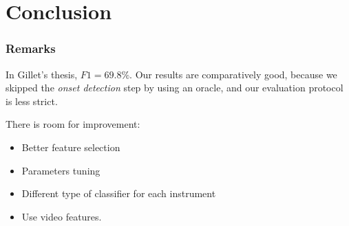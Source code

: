 \documentclass{beamer}
\begin{document}
    \section{Conclusion}

    \begin{frame}
        \frametitle{Remarks}
        In Gillet's thesis, $F1=69.8\%$.
        Our results are comparatively good, because we skipped the \emph{onset detection} step by using an oracle, and our evaluation protocol is less strict.
        \vspace{0.5cm}
        
        There is room for improvement:
        \begin{itemize}
        \item Better feature selection
        \item Parameters tuning
        \item Different type of classifier for each instrument
        \item Use video features.
        \end{itemize}
    \end{frame}
\end{document}
